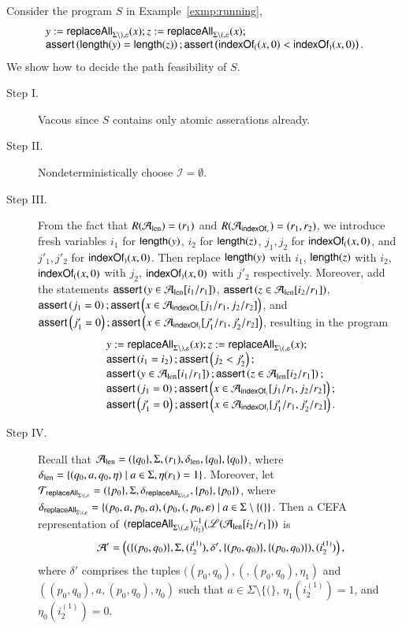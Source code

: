 \begin{example}
Consider the program $S$ in Example~\ref{exmp:running},
\[
\begin{array}{l}
y := \mathsf{replaceAll}_{\Sigma \setminus ), \varepsilon}(x); z:= \mathsf{replaceAll}_{\Sigma \setminus (, \varepsilon}(x);\\
\textsf{assert}\left(\mathsf{length}(y) = \mathsf{length}(z)\right); \textsf{assert}\left(\mathsf{indexOf}_{(}(x,0) < \mathsf{indexOf}_{)}(x,0)\right).
\end{array}
\] 
We show how to decide the path feasibility of $S$. 
\begin{description}
\item[Step I.]   Vacous since $S$ contains only atomic asserations already. %
%
\item[Step II.] Nondeterministically choose $\mathcal{I} = \emptyset$.  
%
\item[Step III.] From the fact that $R(\mathcal{A}_{\rm len})=(r_1)$ and $R(\mathcal{A}_{\mathsf{indexOf}_v})=(r_1,r_2)$, we introduce fresh variables $i_1$ for $\mathsf{length}(y)$, $i_2$ for $\mathsf{length}(z)$, $j_1, j_2$ for $\mathsf{indexOf}_{(}(x,0)$, and $j'_1,j'_2$ for $\mathsf{indexOf}_{)}(x,0)$. Then replace $\mathsf{length}(y)$ with $i_1$, $\mathsf{length}(z)$ with $i_2$, $\mathsf{indexOf}_{(}(x,0)$ with $j_2$, $\mathsf{indexOf}_{)}(x,0)$ with $j'_2$ respectively. Moreover, add the statements $\textsf{assert}\left(y \in \mathcal{A}_{\rm len}[i_1/r_1]\right)$, $\textsf{assert}\left(z \in \mathcal{A}_{\rm len}[i_2/r_1]\right)$, $\textsf{assert}\left(j_1 = 0\right); \textsf{assert}\left(x \in \mathcal{A}_{\mathsf{indexOf}_{(}}[j_1/r_1, j_2/r_2]\right)$, and $\textsf{assert}\left(j'_1 = 0\right); \textsf{assert}\left(x \in \mathcal{A}_{\mathsf{indexOf}_{)}}[j'_1/r_1, j'_2/r_2]\right)$, resulting in  the program 
\[
\begin{array}{l}
y := \mathsf{replaceAll}_{\Sigma \setminus ), \varepsilon}(x); z:= \mathsf{replaceAll}_{\Sigma \setminus (, \varepsilon}(x);\\
\textsf{assert}\left(i_1 = i_2\right); \textsf{assert}\left( j_2 < j'_2\right);\\
\textsf{assert}\left(y \in \mathcal{A}_{\rm len}[i_1/r_1]\right); \textsf{assert}\left(z \in \mathcal{A}_{\rm len}[i_2/r_1]\right);\\
\textsf{assert}\left(j_1 = 0\right); \textsf{assert}\left(x \in \mathcal{A}_{\mathsf{indexOf}_{(}}[j_1/r_1, j_2/r_2]\right);  \\
\textsf{assert}\left(j'_1 = 0\right); \textsf{assert}\left(x \in \mathcal{A}_{\mathsf{indexOf}_{)}}[j'_1/r_1, j'_2/r_2]\right).
\end{array}
\] 
%
\item[Step IV.] Recall that $\mathcal{A}_{\rm len}=(\{q_0\}, \Sigma, (r_1), \delta_{\rm len}, \{q_0\}, \{q_0\})$, where $\delta_{\rm len} = \{(q_0, a, q_0, \eta) \mid a \in \Sigma, \eta(r_1)=1\}$. Moreover, let $\mathcal{T}_{\mathsf{replaceAll}_{\Sigma \setminus (, \varepsilon}} = (\{p_0\}, \Sigma, \delta_{\mathsf{replaceAll}_{\Sigma \setminus (, \varepsilon}}, \{p_0\}, \{p_0\})$, where $\delta_{\mathsf{replaceAll}_{\Sigma \setminus (, \varepsilon}} = \{(p_0, a, p_0, a), (p_0, (, p_0, \varepsilon) \mid a \in \Sigma \setminus \{(\}\}$. Then a CEFA representation of $(\mathsf{replaceAll}_{\Sigma \setminus (, \varepsilon})^{-1}_{(i_2)}(\mathscr{L}(\mathcal{A}_{\rm len}[i_2/r_1]))$ is 
%
\[\mathcal{A}' = \left((\{(p_0, q_0)\}, \Sigma, (i^{(1)}_2), \delta', \{(p_0, q_0)\}, \{(p_0, q_0)\}), (i^{(1)}_2)\right),\]
%
where $\delta'$ comprises the tuples $((p_0,q_0), (, (p_0,q_0), \eta_1)$ and $((p_0,q_0), a, (p_0,q_0), \eta_0)$ such that $a \in \Sigma \setminus \{(\}$, $\eta_1(i^{(1)}_2)=1$, and $\eta_0(i^{(1)}_2)=0$. 


\end{description}
\end{example}
